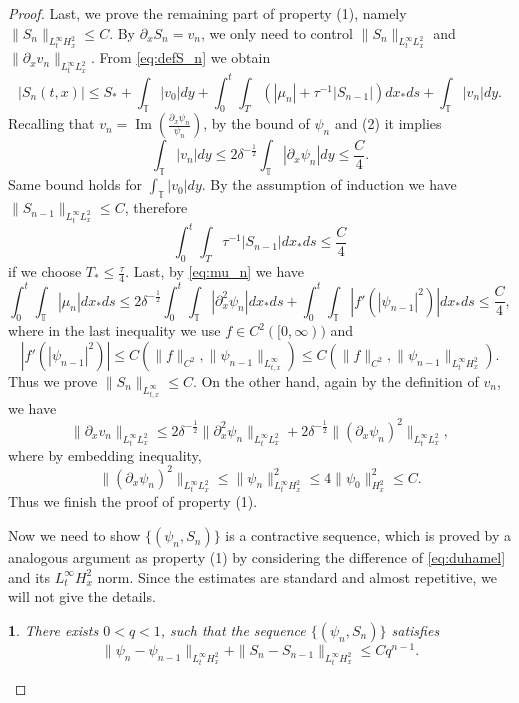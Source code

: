 \documentclass[10pt,a4paper]{amsart}
\newtheorem{lem}{}
\DeclareMathOperator{\IM}{Im}
\def\T{{\mathbb T}}%
\def\d{{\partial}}
\begin{document}
\begin{proof}
Last, we prove the remaining part of property (1), namely $\|S_n\|_{L^\infty_tH^2_x}\leq C$. By $\d_xS_n=v_n$, we only need to control $\|S_n\|_{L^\infty_tL^2_x}$ and $\|\d_x v_n\|_{L^\infty_tL^2_x}$.
From \eqref{eq:defS_n} we obtain
\[
|S_n(t,x)|\leq S_*+ \int_\T|v_0|dy+\int_0^t\int_T(|\mu_n|+\tau^{-1}|S_{n-1}|)dx_*ds+\int_\T|v_n|dy.
\]
Recalling that $v_n=\IM(\frac{\d_x\psi_n}{\psi_n})$, by the bound of $\psi_n$ and (2) it implies
\[
\int_\T|v_n|dy\leq 2\delta^{-\frac12}\int_\T |\d_x\psi_n|dy\leq \frac{C}{4}.
\]
Same bound holds for $\int_\T|v_0|dy$. By the assumption of induction we have $\|S_{n-1}\|_{L^\infty_tL^2_x}\leq C$, therefore
\[
\int_0^t\int_T\tau^{-1}|S_{n-1}|dx_*ds\leq \frac{C}{4}
\]
if we choose $T_*\leq \frac{\tau}{4}$. Last, by \eqref{eq:mu_n} we have
\[
\int_0^t\int_\T|\mu_n|dx_*ds\leq 2\delta^{-\frac12}\int_0^t\int_\T|\d_x^2\psi_n|dx_*ds+\int_0^t\int_\T|f'(|\psi_{n-1}|^2)|dx_*ds\leq \frac{C}{4},
\]
where in the last inequality we use $f\in C^2([0,\infty))$ and 
\[
|f'(|\psi_{n-1}|^2)|\leq C(\|f\|_{C^2},\|\psi_{n-1}\|_{L^\infty_{t,x}})\leq C(\|f\|_{C^2},\|\psi_{n-1}\|_{L^\infty_{t}H^2_x}).
\]
Thus we prove $\|S_n\|_{L^\infty_{t,x}}\leq C$. On the other hand, again by the definition of $v_n$, we have
\[
\|\d_xv_n\|_{L_t^\infty L^2_x}\leq 2\delta^{-\frac12}\|\d_x^2\psi_n\|_{L_t^\infty L^2_x}+2\delta^{-\frac12}\|(\d_x\psi_n)^2\|_{L_t^\infty L^2_x},
\]
where by embedding inequality,
\[
\|(\d_x\psi_n)^2\|_{L_t^\infty L^2_x}\leq \|\psi_n\|_{L_t^\infty H^2_x}^2\leq 4\|\psi_0\|_{H^2_x}^2\leq C.
\]
Thus we finish the proof of property (1).

Now we need to show $\{(\psi_n,S_n)\}$ is a contractive sequence, which is proved by a analogous argument as property (1) by considering the difference of \eqref{eq:duhamel} and its $L^\infty_tH^2_x$ norm. Since the estimates are standard and almost repetitive, we will not give the details.

\begin{lem}\label{lem:contr}
There exists $0<q<1$, such that the sequence $\{(\psi_n,S_n)\}$ satisfies
\[
\|\psi_n-\psi_{n-1}\|_{L^\infty_tH^2_x}+\|S_{n}-S_{n-1}\|_{L^\infty_tH^2_x}\leq Cq^{n-1}.
\]
\end{lem}


\end{proof}
\end{document}
